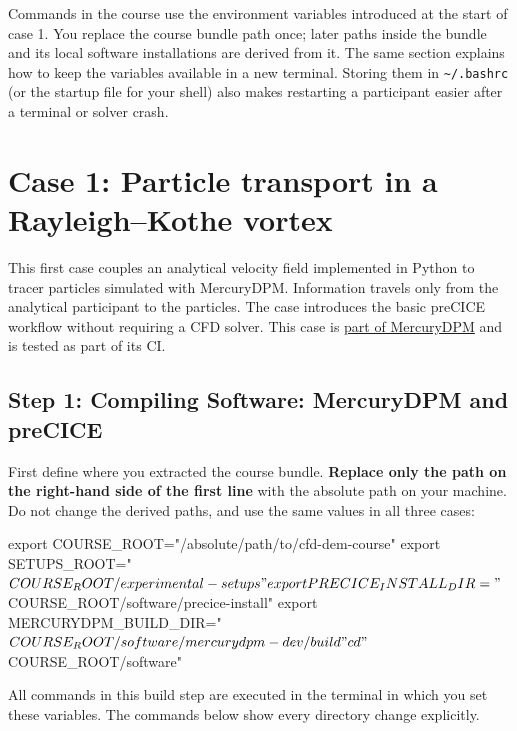 Commands in the course use the environment variables introduced at the
start of case 1. You replace the course bundle path once; later paths
inside the bundle and its local software installations are derived from
it. The same section explains how to keep the variables available in a
new terminal. Storing them in \nolinkurl{~/.bashrc} (or the startup file
for your shell) also makes restarting a participant easier after a
terminal or solver crash.

\section[Rayleigh--Kothe particle transport]{Case 1: Particle transport in a Rayleigh--Kothe vortex}\label{01-rayleigh-kothe__readmemd__case-1-particle-transport-in-a-rayleighkothe-vortex}

This first case couples an analytical velocity field implemented in
Python to tracer particles simulated with MercuryDPM. Information
travels only from the analytical participant to the particles. The case
introduces the basic preCICE workflow without requiring a CFD solver.
This case is
\href{https://bitbucket.org/mercurydpm/mercurydpm/src/master/Drivers/PreCICE/}{part
of MercuryDPM} and is tested as part of its CI.

\subsection{Step 1: Compiling Software: MercuryDPM and
preCICE}\label{01-rayleigh-kothe__readmemd__step-1-compiling-software-mercurydpm-and-precice}

First define where you extracted the course bundle. \textbf{Replace only
the path on the right-hand side of the first line} with the absolute
path on your machine. Do not change the derived paths, and use the same
values in all three cases:

\noindent\begin{minipage}{\linewidth}
\begin{CourseCode}
export COURSE_ROOT="/absolute/path/to/cfd-dem-course"
export SETUPS_ROOT="$COURSE_ROOT/experimental-setups"
export PRECICE_INSTALL_DIR="$COURSE_ROOT/software/precice-install"
export MERCURYDPM_BUILD_DIR="$COURSE_ROOT/software/mercurydpm-dev/build"
cd "$COURSE_ROOT/software"
\end{CourseCode}
\end{minipage}

All commands in this build step are executed in the terminal in which
you set these variables. The commands below show every directory change
explicitly.

